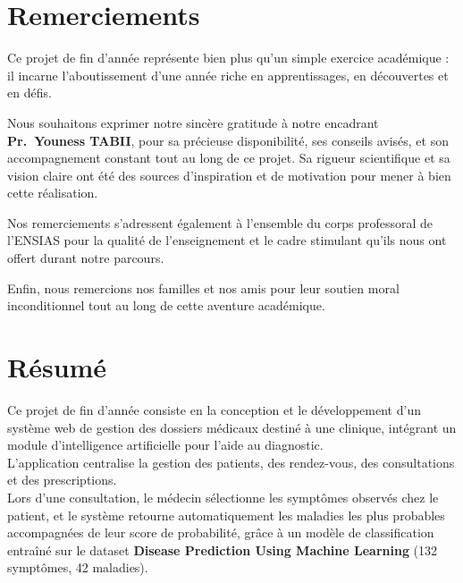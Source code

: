 \documentclass[12pt,a4paper]{report}
\begin{document}
\chapter*{Remerciements}
\thispagestyle{fancy}

Ce projet de fin d'année représente bien plus qu'un simple exercice académique : il
incarne l'aboutissement d'une année riche en apprentissages, en découvertes et en défis.

Nous souhaitons exprimer notre sincère gratitude à notre encadrant \textbf{Pr.~Youness
TABII}, pour sa précieuse disponibilité, ses conseils avisés, et son accompagnement constant
tout au long de ce projet. Sa rigueur scientifique et sa vision claire ont été des sources
d'inspiration et de motivation pour mener à bien cette réalisation.

Nos remerciements s'adressent également à l'ensemble du corps professoral de
l'ENSIAS pour la qualité de l'enseignement et le cadre stimulant qu'ils nous ont offert
durant notre parcours.

Enfin, nous remercions nos familles et nos amis pour leur soutien moral inconditionnel
tout au long de cette aventure académique.

\chapter*{Résumé}
\thispagestyle{fancy}

Ce projet de fin d'année consiste en la conception et le développement d'un système web de gestion des dossiers médicaux destiné à une clinique, intégrant un module d'intelligence artificielle pour l'aide au diagnostic.\\

L'application centralise la gestion des patients, des rendez-vous, des consultations et des prescriptions.\\

Lors d'une consultation, le médecin sélectionne les symptômes observés chez le patient, et le système retourne automatiquement les maladies les plus probables accompagnées de leur score de probabilité, grâce à un modèle de classification entraîné sur le dataset \textbf{Disease Prediction Using Machine Learning} (132 symptômes, 42 maladies).\\
\end{document}
